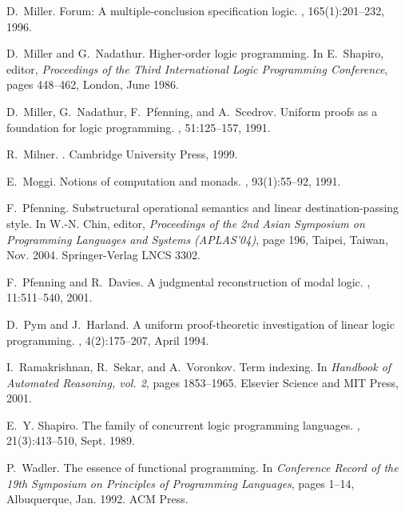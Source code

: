 \documentclass{sig-alt}
\begin{document}
\begin{thebibliography}{50}
D.~Miller.
\newblock Forum: {A} multiple-conclusion specification logic.
, 165(1):201--232, 1996.

D.~Miller and G.~Nadathur.
\newblock Higher-order logic programming.
\newblock In E.~Shapiro, editor, {\em Proceedings of the Third International
  Logic Programming Conference}, pages 448--462, London, June 1986.

D.~Miller, G.~Nadathur, F.~Pfenning, and A.~Scedrov.
\newblock Uniform proofs as a foundation for logic programming.
, 51:125--157, 1991.

R.~Milner.
.
\newblock Cambridge University Press, 1999.

E.~Moggi.
\newblock Notions of computation and monads.
, 93(1):55--92, 1991.

F.~Pfenning.
\newblock Substructural operational semantics and linear destination-passing
  style.
\newblock In W.-N. Chin, editor, {\em Proceedings of the 2nd Asian Symposium on
  Programming Languages and Systems (APLAS'04)}, page 196, Taipei, Taiwan, Nov.
  2004. Springer-Verlag LNCS 3302.

F.~Pfenning and R.~Davies.
\newblock A judgmental reconstruction of modal logic.
, 11:511--540, 2001.

D.~Pym and J.~Harland.
\newblock A uniform proof-theoretic investigation of linear logic programming.
, 4(2):175--207, April 1994.

I.~Ramakrishnan, R.~Sekar, and A.~Voronkov.
\newblock Term indexing.
\newblock In {\em Handbook of Automated Reasoning, vol. 2}, pages 1853--1965.
  Elsevier Science and MIT Press, 2001.

E.~Y. Shapiro.
\newblock The family of concurrent logic programming languages.
, 21(3):413--510, Sept. 1989.

P.~Wadler.
\newblock The essence of functional programming.
\newblock In {\em Conference Record of the 19th Symposium on Principles of
  Programming Languages}, pages 1--14, Albuquerque, Jan. 1992. ACM Press.


\end{thebibliography}
\end{document}
